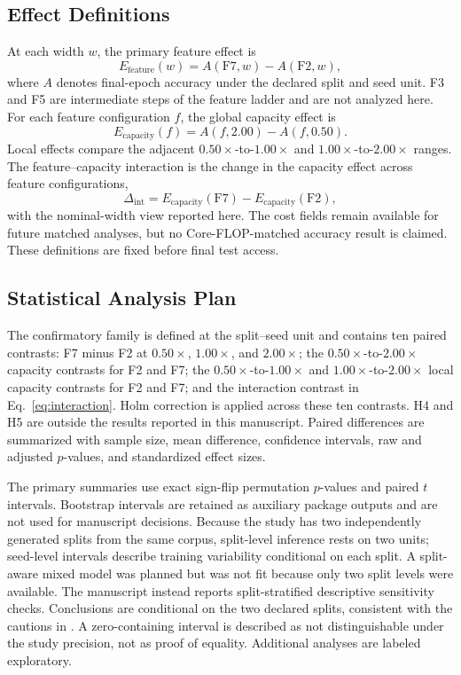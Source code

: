 \subsection{Effect Definitions}
At each width $w$, the primary feature effect is
\begin{equation}
 E_{\mathrm{feature}}(w)=A(\mathrm{F7},w)-A(\mathrm{F2},w),
\end{equation}
where $A$ denotes final-epoch accuracy under the declared split and seed unit.
F3 and F5 are intermediate steps of the feature ladder and are not analyzed
here. For each feature
configuration $f$, the global capacity effect is
\begin{equation}
 E_{\mathrm{capacity}}(f)=A(f,2.00)-A(f,0.50).
\end{equation}
Local effects compare the adjacent $0.50\times$-to-$1.00\times$ and
$1.00\times$-to-$2.00\times$ ranges. The
feature--capacity interaction is the change in the capacity effect across
feature configurations,
\begin{equation}
 \Delta_{\mathrm{int}} = E_{\mathrm{capacity}}(\mathrm{F7})
 - E_{\mathrm{capacity}}(\mathrm{F2}), \label{eq:interaction}
\end{equation}
with the nominal-width view reported here. The cost fields remain available for
future matched analyses, but no Core-FLOP-matched accuracy result is claimed.
These definitions are fixed before final test access.

\subsection{Statistical Analysis Plan}
The confirmatory family is defined at the split--seed unit and contains ten
paired contrasts: F7 minus F2 at $0.50\times$, $1.00\times$, and $2.00\times$;
the $0.50\times$-to-$2.00\times$ capacity contrasts for F2 and F7; the
$0.50\times$-to-$1.00\times$ and $1.00\times$-to-$2.00\times$ local
capacity contrasts for F2 and F7; and the interaction contrast in
Eq.~\eqref{eq:interaction}. Holm correction is applied across these ten
contrasts. H4 and H5 are outside the results reported in this manuscript. Paired
differences are summarized with sample size, mean difference, confidence
intervals, raw and adjusted $p$-values, and standardized effect sizes.

The primary summaries use exact sign-flip permutation $p$-values and paired
$t$ intervals. Bootstrap intervals are retained as auxiliary package outputs and are not used
for manuscript decisions. Because the study has two independently generated splits from the same corpus,
split-level inference rests on two units; seed-level intervals describe
training variability conditional on each split. A split-aware mixed model was
planned but was not fit because only two split levels were available. The
manuscript instead reports split-stratified descriptive sensitivity checks.
Conclusions are conditional on the two declared splits, consistent with the
cautions in \cite{Dietterich1998Tests}.
A zero-containing interval is described as not distinguishable under the study
precision, not as proof of equality. Additional analyses are labeled
exploratory.

